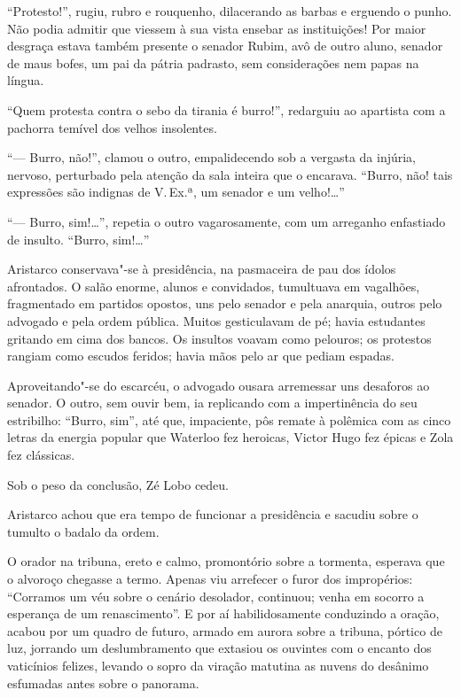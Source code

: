 ``Protesto!'', rugiu, rubro e rouquenho, dilacerando
as barbas e erguendo o punho. Não podia admitir que viessem à sua vista
ensebar as instituições! Por maior desgraça estava também presente o
senador Rubim, avô de outro aluno, senador de maus bofes, um pai da
pátria padrasto, sem considerações nem papas na língua. 

``Quem protesta contra o sebo da tirania é burro!'', redarguiu ao apartista com a
pachorra temível dos velhos insolentes. 

``--- Burro, não!'', clamou o
outro, empalidecendo sob a vergasta da injúria, nervoso, perturbado
pela atenção da sala inteira que o encarava. ``Burro, não! tais
expressões são indignas de V.\,Ex.ª, um senador e um velho!\ldots{}'' 

``--- Burro, sim!\ldots{}'', repetia o outro vagarosamente, com um arreganho
enfastiado de insulto. ``Burro, sim!\ldots{}''

Aristarco conservava"-se à
presidência, na pasmaceira de pau dos ídolos afrontados. O salão
enorme, alunos e convidados, tumultuava em vagalhões, fragmentado em
partidos opostos, uns pelo senador e pela anarquia, outros pelo
advogado e pela ordem pública. Muitos gesticulavam de pé; havia
estudantes gritando em cima dos bancos. Os insultos voavam como
pelouros; os protestos rangiam como escudos feridos; havia mãos pelo ar
que pediam espadas. 

Aproveitando"-se do escarcéu, o advogado ousara
arremessar uns desaforos ao senador. O outro, sem ouvir bem, ia
replicando com a impertinência do seu estribilho: ``Burro, sim'', até
que, impaciente, pôs remate à polêmica com as cinco letras da energia
popular que Waterloo fez heroicas, Victor Hugo fez épicas e Zola fez
clássicas. 

Sob o peso da conclusão, Zé Lobo cedeu. 

Aristarco achou que
era tempo de funcionar a presidência e sacudiu sobre o tumulto o badalo
da ordem. 

O orador na tribuna, ereto e calmo, promontório sobre a
tormenta, esperava que o alvoroço chegasse a termo. Apenas viu
arrefecer o furor dos impropérios: ``Corramos um véu sobre o cenário
desolador, continuou; venha em socorro a esperança de um renascimento''.
E por aí habilidosamente conduzindo a oração, acabou por um quadro de
futuro, armado em aurora sobre a tribuna, pórtico de luz, jorrando um
deslumbramento que extasiou os ouvintes com o encanto dos vaticínios
felizes, levando o sopro da viração matutina as nuvens do desânimo
esfumadas antes sobre o panorama. 

